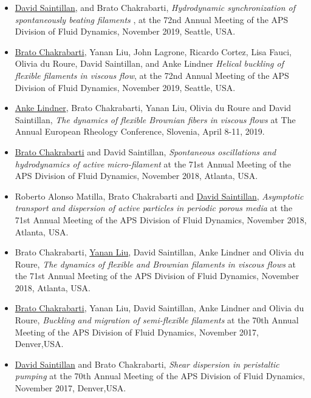\documentclass[10pt]{res} %
\begin{document}
\begin{resume}
\begin{itemize}
		\item \underline{David Saintillan}, and Brato Chakrabarti, \textit{Hydrodynamic synchronization of spontaneously beating filaments
		}, at the 72nd Annual Meeting of the APS Division of Fluid Dynamics, November 2019, Seattle, USA.
	
		\item \underline{Brato Chakrabarti}, Yanan Liu, John Lagrone, Ricardo Cortez, Lisa Fauci, Olivia du Roure, David Saintillan, and Anke Lindner \textit{Helical buckling of flexible filaments in viscous flow},  at the 72nd Annual Meeting of the APS Division of Fluid Dynamics, November 2019, Seattle, USA.
	
	\item \underline{Anke Lindner}, Brato Chakrabarti, Yanan Liu, Olivia du Roure and David Saintillan, \textit{The dynamics of flexible Brownian fibers in viscous flows} at  The Annual European Rheology Conference, Slovenia, April 8-11, 2019.
	
	\item \underline{Brato Chakrabarti} and David Saintillan, \textit{Spontaneous oscillations and hydrodynamics of active micro-filament} at the 71st Annual Meeting of the APS Division of Fluid Dynamics, November 2018, Atlanta, USA. 
	
	\item Roberto Alonso Matilla, Brato Chakrabarti and \underline{David Saintillan}, \textit{Asymptotic transport and dispersion of active particles in periodic porous media} at the 71st Annual Meeting of the APS Division of Fluid Dynamics, November 2018, Atlanta, USA. 
	
	\item Brato Chakrabarti, \underline{Yanan Liu}, David Saintillan, Anke Lindner and Olivia du Roure, \textit{The dynamics of flexible and Brownian filaments in viscous flows} at the 71st Annual Meeting of the APS Division of Fluid Dynamics, November 2018, Atlanta, USA. 
	
	\item \underline{Brato Chakrabarti}, Yanan Liu, David Saintillan, Anke Lindner and Olivia du Roure, \textit{Buckling and migration of semi-flexible filaments} at the 70th Annual Meeting of the APS Division of Fluid Dynamics, November 2017,
	Denver,USA. 
	
	\item \underline{David Saintillan} and Brato Chakrabarti, \textit{Shear dispersion in peristaltic pumping} at the 70th Annual Meeting of the APS Division of Fluid Dynamics, November 2017,
		Denver,USA. 
	

\end{itemize}
\end{resume}
\end{document}
